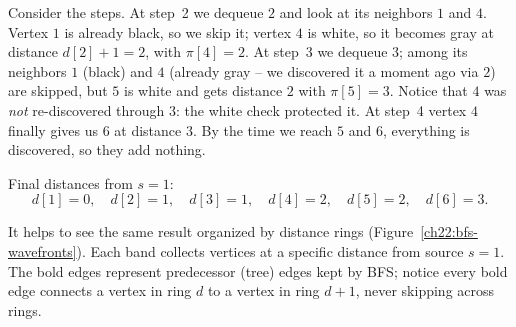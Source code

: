 Consider the steps. At step~2 we dequeue $2$ and look at its
neighbors $1$ and $4$. Vertex $1$ is already black, so we skip it; vertex $4$ is
white, so it becomes gray at distance $d[2]+1 = 2$, with $\pi[4] = 2$. At step~3
we dequeue $3$; among its neighbors $1$ (black) and $4$ (already gray -- we
discovered it a moment ago via $2$) are skipped, but $5$ is white and gets
distance $2$ with $\pi[5]=3$. Notice that $4$ was \emph{not} re-discovered
through $3$: the white check protected it. At step~4 vertex $4$ finally gives us
$6$ at distance $3$. By the time we reach $5$ and $6$, everything is discovered,
so they add nothing.

Final distances from $s=1$:
\[
d[1]=0,\quad d[2]=1,\quad d[3]=1,\quad d[4]=2,\quad d[5]=2,\quad d[6]=3.
\]

It helps to see the same result organized by distance rings (Figure~\ref{ch22:bfs-wavefronts}).
Each band collects vertices at a specific distance from source $s=1$. The bold edges
represent predecessor (tree) edges kept by BFS; notice every bold edge connects a vertex
in ring $d$ to a vertex in ring $d+1$, never skipping across rings.

